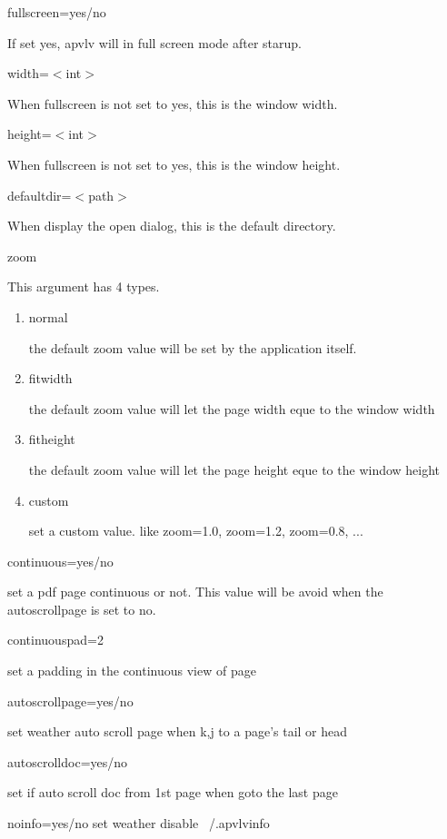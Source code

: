 \documentclass[a4paper,12pt]{article}
\begin{document}
\begin{description}

\item fullscreen=yes/no

If set yes, apvlv will in full screen mode after starup.

\item width=$<$int$>$

When fullscreen is not set to yes, this is the window width.

\item height=$<$int$>$

When fullscreen is not set to yes, this is the window height.

\item defaultdir=$<$path$>$

When display the open dialog, this is the default directory.

\item zoom

This argument has 4 types.

\begin{enumerate}

\item normal

the default zoom value will be set by the application itself.

\item fitwidth

the default zoom value will let the page width eque to the window width

\item fitheight

the default zoom value will let the page height eque to the window height

\item custom

set a custom value. like zoom=1.0, zoom=1.2, zoom=0.8, ...

\end{enumerate}

\item continuous=yes/no

set a pdf page continuous or not. This value will be avoid when the autoscrollpage is set to no.

\item continuouspad=2

set a padding in the continuous view of page

\item autoscrollpage=yes/no

set weather auto scroll page when k,j to a page's tail or head

\item autoscrolldoc=yes/no

set if auto scroll doc from 1st page when goto the last page

\item noinfo=yes/no
set weather disable ~/.apvlvinfo

\end{description}
\end{document}
